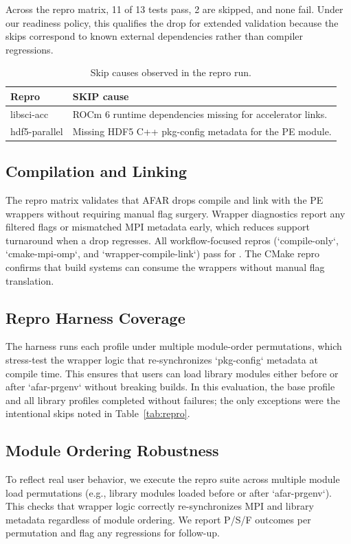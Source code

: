 Across the repro matrix, 11 of 13 tests pass, 2 are skipped, and none fail.
Under our readiness policy, this qualifies the drop for extended validation
because the skips correspond to known external dependencies rather than
compiler regressions.

\begin{table}[t]
  \centering
  \small
  \setlength{\tabcolsep}{4pt}
  \caption{Skip causes observed in the \afarversion repro run.}
  \label{tab:skip-causes}
  \begin{tabular}{l p{}}
    \hline
    Repro & SKIP cause \\
    \hline
    libsci-acc & ROCm 6 runtime dependencies missing for accelerator links. \\
    hdf5-parallel & Missing HDF5 C++ pkg-config metadata for the PE module. \\
    \hline
  \end{tabular}
\end{table}

\subsection{Compilation and Linking}
\label{sec:compile}
The repro matrix validates that AFAR drops compile and link with the PE
wrappers without requiring manual flag surgery. Wrapper diagnostics report any
filtered flags or mismatched MPI metadata early, which reduces support
turnaround when a drop regresses.
All workflow-focused repros (`compile-only`, `cmake-mpi-omp`, and
`wrapper-compile-link`) pass for \afarversion.
The CMake repro confirms that build systems can consume the wrappers without
manual flag translation.

\subsection{Repro Harness Coverage}
\label{sec:coverage}
The harness runs each profile under multiple module-order permutations, which
stress-test the wrapper logic that re-synchronizes `pkg-config` metadata at
compile time. This ensures that users can load library modules either before
or after `afar-prgenv` without breaking builds. In this evaluation, the base
profile and all library profiles completed without failures; the only
exceptions were the intentional skips noted in Table~\ref{tab:repro}.

\subsection{Module Ordering Robustness}
\label{sec:ordering}
To reflect real user behavior, we execute the repro suite across multiple
module load permutations (e.g., library modules loaded before or after
`afar-prgenv`). This checks that wrapper logic correctly re-synchronizes MPI
and library metadata regardless of module ordering. We report P/S/F outcomes
per permutation and flag any regressions for follow-up.

